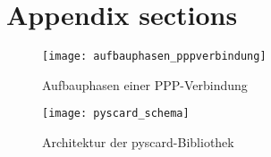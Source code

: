 \section{Appendix sections}

 \begin{figure}[htp]
  \begin{center}
   \texttt{[image: aufbauphasen\_pppverbindung]}
  \end{center}
  \caption{Aufbauphasen einer PPP-Verbindung}\cite{zackercomptia}
  \label{abb:aufbauphasen_pppverbindung}
 \end{figure}

 \begin{figure}[htp]
  \begin{center}
   \texttt{[image: pyscard\_schema]}
  \end{center}
  \caption{Architektur der pyscard-Bibliothek}\cite{pyscardweb}
  \label{abb:pyscard_schema}
 \end{figure}